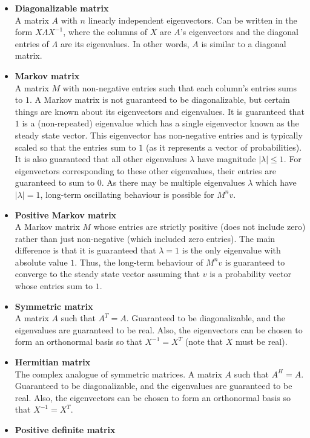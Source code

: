 \documentclass[11pt]{article}
\theoremstyle{plain} %
\theoremstyle{definition}
\theoremstyle{remark}
\begin{document}
\begin{itemize}
\item \textbf{Diagonalizable matrix}\\
A matrix $A$ with $n$ linearly independent eigenvectors. Can be written in the form $X\Lambda X^{-1}$, where the columns of $X$ are $A$'s eigenvectors and the diagonal entries of $\Lambda$ are its eigenvalues. In other words, $A$ is similar to a diagonal matrix.
\item \textbf{Markov matrix}\\
A matrix $M$ with non-negative entries such that each column's entries sums to $1$. A Markov matrix is not guaranteed to be diagonalizable, but certain things are known about its eigenvectors and eigenvalues. It is guaranteed that $1$ is a (non-repeated) eigenvalue which has a single eigenvector known as the steady state vector. This eigenvector has non-negative entries and is typically scaled so that the entries sum to $1$ (as it represents a vector of probabilities). It is also guaranteed that all other eigenvalues $\lambda$ have magnitude $|\lambda| \le 1$. For eigenvectors corresponding to these other eigenvalues, their entries are guaranteed to sum to $0$. As there may be multiple eigenvalues $\lambda$ which have $|\lambda| = 1$, long-term oscillating behaviour is possible for $M^nv$.
\item \textbf{Positive Markov matrix}\\
A Markov matrix $M$ whose entries are strictly positive (does not include zero) rather than just non-negative (which included zero entries). The main difference is that it is guaranteed that $\lambda = 1$ is the only eigenvalue with absolute value $1$. Thus, the long-term behaviour of $M^nv$ is guaranteed to converge to the steady state vector assuming that $v$ is a probability vector whose entries sum to $1$.
\item \textbf{Symmetric matrix}\\
A matrix $A$ such that $A^T = A$. Guaranteed to be diagonalizable, and the eigenvalues are guaranteed to be real. Also, the eigenvectors can be chosen to form an orthonormal basis so that $X^{-1} = X^T$ (note that $X$ must be real).
\item \textbf{Hermitian matrix}\\
The complex analogue of symmetric matrices. A matrix $A$ such that $A^H = A$. Guaranteed to be diagonalizable, and the eigenvalues are guaranteed to be real. Also, the eigenvectors can be chosen to form an orthonormal basis so that $X^{-1} = X^T$.
\item \textbf{Positive definite matrix}\\

\end{itemize}
\end{document}

